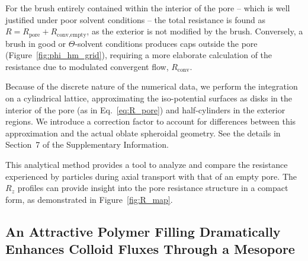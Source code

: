 \documentclass[12pt, a4paper]{article}
\begin{document}
For the brush entirely contained within the interior of the pore -- which is well justified under poor solvent conditions -- the total resistance is found as $R = R_{\textrm{pore}} + R_{\textrm{conv,empty}}$, as the exterior is not modified by the brush.
Conversely, a brush in good or $\Theta$-solvent conditions produces caps outside the pore (Figure~\ref{fig:phi_hm_grid}), requiring a more elaborate calculation of the resistance due to modulated convergent flow, $R_{\textrm{conv}}$.

Because of the discrete nature of the numerical data, we perform the integration on a cylindrical lattice, approximating the iso-potential surfaces as disks in the interior of the pore (as in Eq.~\ref{eq:R_pore}) and half-cylinders in the exterior regions.
We introduce a correction factor to account for differences between this approximation and the actual oblate spheroidal geometry.
See the details in Section~7 of the Supplementary Information.

This analytical method provides a tool to analyze and compare the resistance experienced by particles during axial transport with that of an empty pore.
The $R_z$ profiles can provide insight into the pore resistance structure in a compact form, as demonstrated in Figure~\ref{fig:R_map}.


\subsection{An Attractive Polymer Filling Dramatically Enhances Colloid Fluxes Through a Mesopore}
\end{document}
